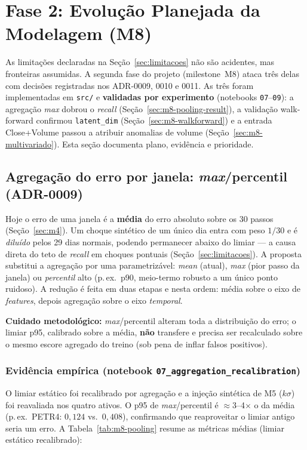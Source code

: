 \section{Fase 2: Evolução Planejada da Modelagem (M8)}
\label{sec:m8-fase2}

As limitações declaradas na Seção~\ref{sec:limitacoes} não são acidentes, mas fronteiras
assumidas. A segunda fase do projeto (milestone~M8) ataca três delas com decisões registradas
nos ADR-0009, 0010 e 0011. As três foram implementadas em \texttt{src/} e \textbf{validadas por
experimento} (notebooks \texttt{07}--\texttt{09}): a agregação \emph{max} dobrou o \emph{recall}
(Seção~\ref{sec:m8-pooling-result}), a validação walk-forward confirmou \texttt{latent\_dim}
(Seção~\ref{sec:m8-walkforward}) e a entrada Close+Volume passou a atribuir anomalias de volume
(Seção~\ref{sec:m8-multivariado}). Esta seção documenta plano, evidência e prioridade.

\subsection{Agregação do erro por janela: \emph{max}/percentil (ADR-0009)}
\label{sec:m8-pooling}
Hoje o erro de uma janela é a \textbf{média} do erro absoluto sobre os 30 passos
(Seção~\ref{sec:m4}). Um choque sintético de um único dia entra com peso $1/30$ e é
\emph{diluído} pelos 29 dias normais, podendo permanecer abaixo do limiar --- a causa direta do
teto de \emph{recall} em choques pontuais (Seção~\ref{sec:limitacoes}). A proposta substitui a
agregação por uma parametrizável: \emph{mean} (atual), \emph{max} (pior passo da janela) ou
\emph{percentil} alto (p.\,ex.\ p90, meio-termo robusto a um único ponto ruidoso). A redução é
feita em duas etapas e nesta ordem: média sobre o eixo de \emph{features}, depois agregação
sobre o eixo \emph{temporal}.
\par\noindent\textbf{Cuidado metodológico:} \emph{max}/percentil alteram toda a distribuição do
erro; o limiar p95, calibrado sobre a média, \textbf{não} transfere e precisa ser recalculado
sobre o mesmo escore agregado do treino (sob pena de inflar falsos positivos).

\subsubsection*{Evidência empírica (notebook \texttt{07\_aggregation\_recalibration})}
\label{sec:m8-pooling-result}
O limiar estático foi recalibrado por agregação e a injeção sintética de M5 ($k\sigma$) foi
reavaliada nos quatro ativos. O p95 de \emph{max}/percentil é $\approx$3--4$\times$ o da média
(p.\,ex.\ PETR4: $0{,}124$ vs.\ $0{,}408$), confirmando que reaproveitar o limiar antigo seria
um erro. A Tabela~\ref{tab:m8-pooling} resume as métricas médias (limiar estático recalibrado):

